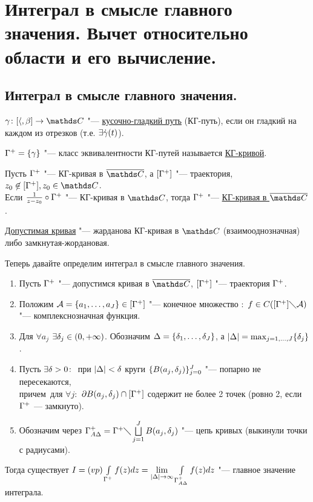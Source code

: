 \newpage
\section{Интеграл в смысле главного значения. Вычет относительно области и его вычисление.}

\subsection{Интеграл в смысле главного значения.}
\begin{Def} 
$\g\colon[\a,\b]\to\C$ "--- \underline{кусочно-гладкий путь} (КГ-путь), если он гладкий на каждом из отрезков (т.е. $\exists \dot{\gamma}(t)$).
\end{Def}

\begin{Def} 
$\Gamma^{+} = \{\gamma \} $ "--- класс эквивалентности КГ-путей называется \underline{КГ-кривой}.
\end{Def}


\begin{Def} 
Пусть $\Gamma^{+}$ "--- КГ-кривая в $\ol\C$, а $[\Gamma^{+}]$ "--- траектория, $z_0 \not\in [\GG], z_0 \in \C$.\\ 
Если $\frac{1}{z-z_0}\circ\Gamma^{+}$ "--- КГ-кривая в $\C$, тогда $\Gamma^{+}$ "--- \underline{КГ-кривая в $\ol\C$}.
\end{Def}


\begin{Def} 
\underline{Допустимая кривая} "--- жарданова КГ-кривая в $\C$ (взаимооднозначная) либо замкнутая-жордановая.
\end{Def}

Теперь давайте определим интеграл в смысле главного значения. 
\begin{enumerate}
\item Пусть $\Gamma^{+}$ "--- допустимся кривая в $\ol\C$, $[\Gamma^{+}]$ "--- траектория $\Gamma^{+}$. 
\item Положим $\mathcal A = \{a_1,\dots,a_J\} \in [\Gamma^{+}]$ "--- конечное множество $\colon$ $f \in C([\Gamma^{+}] \diagdown \mathcal A)$ "--- комплекснозначная функция.
\item Для $\forall a_j$ $\exists \delta_j \in (0,+\infty)$. Обозначим $\Delta = \{\delta_1,\dots,\delta_J\}$, а $|\Delta| = {\max_{j=1,\dots,J}} \{\delta_j\}$.
\item Пусть $\exists \delta > 0 \colon$  при $|\Delta| < \delta$ круги $\{B(a_j,\delta_j)\}_{j=0}^J$ "--- попарно не пересекаются, \\
причем~для $\forall j\colon$ $\partial B(a_j,\delta_j) \cap [\Gamma^{+}]$ содержит не более 2 точек (ровно 2, если $\Gamma^{+}$ --- замкнуто).  
\item Обозначим через $\Gamma^{+}_{A\Delta} = \Gamma^{+} \diagdown \bigsqcup\limits_{j=1}^J B(a_j,\delta_j)$ "--- цепь кривых (выкинули точки с радиусами).
\end{enumerate}
Тогда существует $I = (vp)\int\limits_{\Gamma^{+}} f(z)dz = \lim\limits_{|\Delta| \rightarrow \infty} \int\limits_{\Gamma^{+}_{A\Delta}} f(z)dz$ "--- главное значение интеграла.

